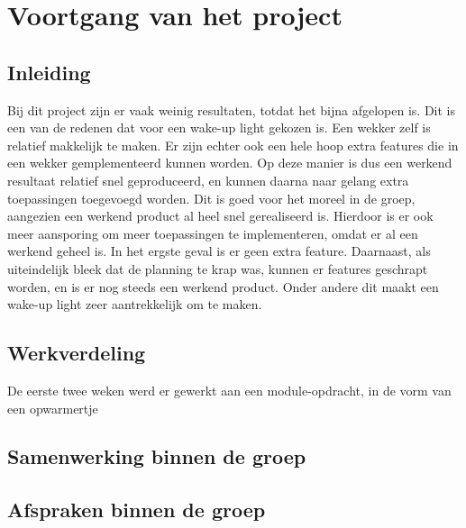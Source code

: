 \chapter{Voortgang van het project}

\section{Inleiding}
Bij dit project zijn er vaak weinig resultaten, totdat het bijna afgelopen is. 
Dit is een van de redenen dat voor een wake-up light gekozen is.
Een wekker zelf is relatief makkelijk te maken. 
Er zijn echter ook een hele hoop extra features die in een wekker gemplementeerd kunnen worden. 
Op deze manier is dus een werkend resultaat relatief snel geproduceerd, en kunnen daarna naar gelang extra toepassingen toegevoegd worden. 
Dit is goed voor het moreel in de groep, aangezien een werkend product al heel snel gerealiseerd is.
Hierdoor is er ook meer aansporing om meer toepassingen te implementeren, omdat er al een werkend geheel is. 
In het ergste geval is er geen extra feature.
Daarnaast, als uiteindelijk bleek dat de planning te krap was, kunnen er features geschrapt worden, en is er nog steeds een werkend product. 
Onder andere dit maakt een wake-up light zeer aantrekkelijk om te maken.

\section{Werkverdeling}
De eerste twee weken werd er gewerkt aan een module-opdracht, in de vorm van een opwarmertje


\section{Samenwerking binnen de groep}

\section{Afspraken binnen de groep}
